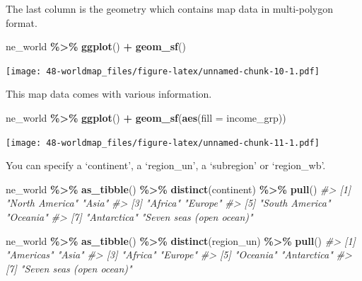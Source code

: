 \documentclass[
  xelatex, ja=standard]{bxjsbook}
\newenvironment{Shaded}{\begin{snugshade}}{\end{snugshade}}
\newcommand{\AttributeTok}[1]{\textcolor[rgb]{0.13,0.29,0.53}{#1}}
\newcommand{\CommentTok}[1]{\textcolor[rgb]{0.56,0.35,0.01}{\textit{#1}}}
\newcommand{\FunctionTok}[1]{\textcolor[rgb]{0.13,0.29,0.53}{\textbf{#1}}}
\newcommand{\NormalTok}[1]{#1}
\newcommand{\SpecialCharTok}[1]{\textcolor[rgb]{0.81,0.36,0.00}{\textbf{#1}}}
\theoremstyle{definition}
\theoremstyle{definition}
\theoremstyle{definition}
\theoremstyle{definition}
\theoremstyle{remark}
\begin{document}
The last column is the geometry which contains map data in multi-polygon format.

\begin{Shaded}
\begin{Highlighting}[]
\NormalTok{ne\_world }\SpecialCharTok{\%\textgreater{}\%} \FunctionTok{ggplot}\NormalTok{() }\SpecialCharTok{+} \FunctionTok{geom\_sf}\NormalTok{()}
\end{Highlighting}
\end{Shaded}

\texttt{[image: 48-worldmap\_files/figure-latex/unnamed-chunk-10-1.pdf]}

This map data comes with various information.

\begin{Shaded}
\begin{Highlighting}[]
\NormalTok{ne\_world }\SpecialCharTok{\%\textgreater{}\%} \FunctionTok{ggplot}\NormalTok{() }\SpecialCharTok{+} \FunctionTok{geom\_sf}\NormalTok{(}\FunctionTok{aes}\NormalTok{(}\AttributeTok{fill =}\NormalTok{ income\_grp))}
\end{Highlighting}
\end{Shaded}

\texttt{[image: 48-worldmap\_files/figure-latex/unnamed-chunk-11-1.pdf]}

You can specify a `continent', a `region\_un', a `subregion' or `region\_wb'.

\begin{Shaded}
\begin{Highlighting}[]
\NormalTok{ne\_world }\SpecialCharTok{\%\textgreater{}\%} \FunctionTok{as\_tibble}\NormalTok{() }\SpecialCharTok{\%\textgreater{}\%} \FunctionTok{distinct}\NormalTok{(continent) }\SpecialCharTok{\%\textgreater{}\%} \FunctionTok{pull}\NormalTok{()}
\CommentTok{\#\textgreater{} [1] "North America"           "Asia"                   }
\CommentTok{\#\textgreater{} [3] "Africa"                  "Europe"                 }
\CommentTok{\#\textgreater{} [5] "South America"           "Oceania"                }
\CommentTok{\#\textgreater{} [7] "Antarctica"              "Seven seas (open ocean)"}
\end{Highlighting}
\end{Shaded}

\begin{Shaded}
\begin{Highlighting}[]
\NormalTok{ne\_world }\SpecialCharTok{\%\textgreater{}\%} \FunctionTok{as\_tibble}\NormalTok{() }\SpecialCharTok{\%\textgreater{}\%} \FunctionTok{distinct}\NormalTok{(region\_un) }\SpecialCharTok{\%\textgreater{}\%} \FunctionTok{pull}\NormalTok{()}
\CommentTok{\#\textgreater{} [1] "Americas"                "Asia"                   }
\CommentTok{\#\textgreater{} [3] "Africa"                  "Europe"                 }
\CommentTok{\#\textgreater{} [5] "Oceania"                 "Antarctica"             }
\CommentTok{\#\textgreater{} [7] "Seven seas (open ocean)"}
\end{Highlighting}
\end{Shaded}
\end{document}
